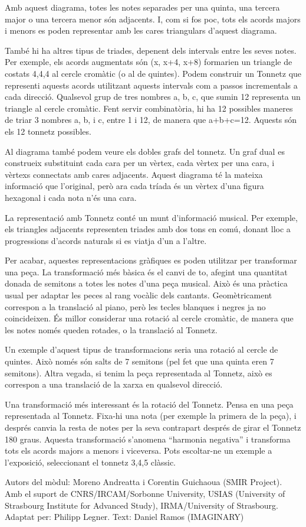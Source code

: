 Amb aquest diagrama, totes les notes separades per una quinta, una tercera major o una tercera menor són adjacents. I, com si fos poc, tots els acords majors i menors es poden representar amb les cares triangulars d'aquest diagrama. 

També hi ha altres tipus de triades, depenent dels intervals entre les seves notes. Per exemple, els acords augmentats són (x, x+4, x+8) formarien un triangle de costats 4,4,4 al cercle cromàtic (o al de quintes). Podem construir un Tonnetz que representi aquests acords utilitzant aquests intervals com a passos incrementals a cada direcció. Qualsevol grup de tres nombres a, b, c, que sumin 12 representa un triangle al cercle cromàtic. Fent servir combinatòria, hi ha 12 possibles maneres de triar 3 nombres a, b, i c, entre 1 i 12, de manera que a+b+c=12. Aquests són els 12 tonnetz possibles.

Al diagrama també podem veure els dobles grafs del tonnetz. Un graf dual es construeix substituint cada cara per un vèrtex, cada vèrtex per una cara, i vèrtexs connectats amb cares adjacents. Aquest diagrama té la mateixa informació que l'original, però ara cada tríada és un vèrtex d'una figura hexagonal i cada nota n'és una cara.

La representació amb Tonnetz conté un munt d'informació musical. Per exemple, els triangles adjacents representen triades amb dos tons en comú, donant lloc a  progressions d'acords naturals si es viatja d'un a l'altre. 

Per acabar, aquestes representacions gràfiques es poden utilitzar per transformar una peça. La transformació més bàsica és el canvi de to, afegint una quantitat donada de semitons a totes les notes d'una peça musical. Això és una pràctica usual per adaptar les peces al rang vocàlic dels cantants. Geomètricament correspon a la translació al piano, però les tecles blanques i negres ja no coincideixen. És millor considerar una rotació al cercle cromàtic, de manera que les notes només queden rotades, o la translació al Tonnetz.

Un exemple d'aquest tipus de transformacions seria una rotació al cercle de quintes. Això només són salts de 7 semitons (pel fet que una quinta eren 7 semitons). Altra vegada, si tenim la peça representada al Tonnetz, això es correspon a una translació de la xarxa en qualsevol direcció.

Una transformació més interessant és la rotació del Tonnetz. Pensa en una peça representada al Tonnetz. Fixa-hi una nota (per exemple la primera de la peça), i després canvia la resta de notes per la seva contrapart després de girar el Tonnetz 180 graus. Aquesta transformació s'anomena ``harmonia negativa'' i transforma tots els acords majors a menors i viceversa. Pots escoltar-ne un exemple a l'exposició, seleccionant el tonnetz 3,4,5 clàssic. 

\vfill

Autors del mòdul: Moreno Andreatta i Corentin Guichaoua (SMIR Project).
Amb el suport de CNRS/IRCAM/Sorbonne University, USIAS (University of Strasbourg Institute for Advanced Study), IRMA/University of Strasbourg.
Adaptat per: Philipp Legner.
Text: Daniel Ramos (IMAGINARY)

